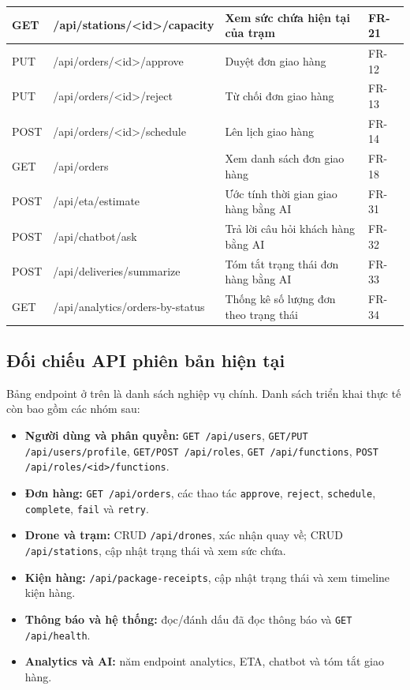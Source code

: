 \begin{longtable}{|p{2.2cm}|p{5.5cm}|p{5cm}|p{1.8cm}|}
\hline
GET & /api/stations/<id>/capacity & Xem sức chứa hiện tại của trạm & FR-21 \\
\hline
PUT & /api/orders/<id>/approve & Duyệt đơn giao hàng & FR-12 \\
\hline
PUT & /api/orders/<id>/reject & Từ chối đơn giao hàng & FR-13 \\
\hline
POST & /api/orders/<id>/schedule & Lên lịch giao hàng & FR-14 \\
\hline
GET & /api/orders & Xem danh sách đơn giao hàng & FR-18 \\
\hline
POST & /api/eta/estimate & Ước tính thời gian giao hàng bằng AI & FR-31 \\
\hline
POST & /api/chatbot/ask & Trả lời câu hỏi khách hàng bằng AI & FR-32 \\
\hline
POST & /api/deliveries/summarize & Tóm tắt trạng thái đơn hàng bằng AI & FR-33 \\
\hline
GET & /api/analytics/orders-by-status & Thống kê số lượng đơn theo trạng thái & FR-34 \\
\hline
\end{longtable}

\subsection{Đối chiếu API phiên bản hiện tại}

Bảng endpoint ở trên là danh sách nghiệp vụ chính. Danh sách triển khai thực tế còn bao gồm các nhóm sau:

\begin{itemize}
  \item \textbf{Người dùng và phân quyền:} \texttt{GET /api/users}, \texttt{GET/PUT /api/users/profile}, \texttt{GET/POST /api/roles}, \texttt{GET /api/functions}, \texttt{POST /api/roles/<id>/functions}.
  \item \textbf{Đơn hàng:} \texttt{GET /api/orders}, các thao tác \texttt{approve}, \texttt{reject}, \texttt{schedule}, \texttt{complete}, \texttt{fail} và \texttt{retry}.
  \item \textbf{Drone và trạm:} CRUD \texttt{/api/drones}, xác nhận quay về; CRUD \texttt{/api/stations}, cập nhật trạng thái và xem sức chứa.
  \item \textbf{Kiện hàng:} \texttt{/api/package-receipts}, cập nhật trạng thái và xem timeline kiện hàng.
  \item \textbf{Thông báo và hệ thống:} đọc/đánh dấu đã đọc thông báo và \texttt{GET /api/health}.
  \item \textbf{Analytics và AI:} năm endpoint analytics, ETA, chatbot và tóm tắt giao hàng.
\end{itemize}

